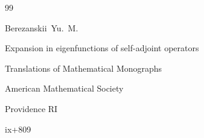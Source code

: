 \begin{thebibliography}{99}










\by Berezanskii~Yu.~M. 

\book Expansion in eigenfunctions of self-adjoint operators


\serial Translations of Mathematical Monographs

\publ  American Mathematical Society

\publaddr Providence RI


\totalpages   ix+809










\end{thebibliography}







%
















